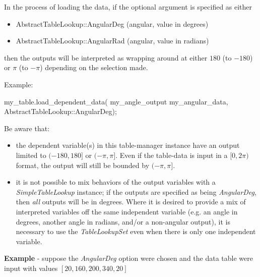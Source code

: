 \documentclass[11pt,fleqn]{report}
\begin{document}
 In the process of loading the data, if the optional argument is specified as
 either
 \begin{itemize}
  \item AbstractTableLookup::AngularDeg (angular, value in degrees)
  \item AbstractTableLookup::AngularRad (angular, value in radians)
 \end{itemize}
 then the outputs will be interpreted as wrapping around at either $180$
 (to $-180$) or $\pi$ (to $-\pi$) depending on the selection made.

 Example:
 \begin{code}
my_table.load_dependent_data( my_angle_output
                              my_angular_data,
                              AbstractTableLookup::AngularDeg);
 \end{code}

 Be aware that:
 \begin{itemize}
  \item the dependent variable(s) in this table-manager instance have an output
        limited to $(-180,180]$ or $(-\pi, \pi]$.  Even if the table-data is
        input in a $[0, 2 \pi)$ format, the output will still be bounded by
        $(-\pi, \pi]$.
  \item it is not possible to mix behaviors of the output variables
        with a \textit{SimpleTableLookup} instance; if the outputs are specified
        as being \textit{AngularDeg}, then \textit{all} outputs will be in
        degrees.  Where it is desired to  provide a mix of interpreted
        variables off the same independent variable (e.g. an angle in
        degrees, another angle in radians, and/or a non-angular output), it
        is necessary to use the \textit{TableLookupSet} even when there is
        only one independent variable.
 \end{itemize}
 \textbf{Example} - suppose the \textit{AngularDeg} option were chosen and the
 data table were input with values
 $[20, 160, 200, 340, 20]$


\end{document}
